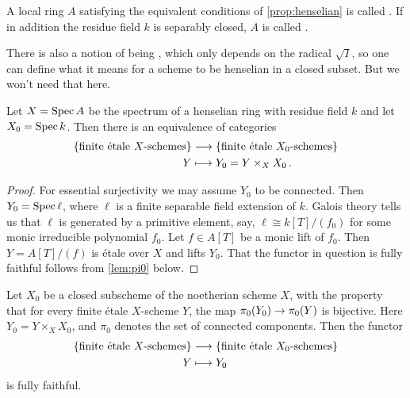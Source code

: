 \documentclass[a4paper, 10pt, oneside, DIV=9, chapterprefix=true, numbers=enddot, bibliography=totoc]{scrbook}
\begin{document}
\begin{defi}\label{def:henselian}
	A local ring $A$ satisfying the equivalent conditions of \cref{prop:henselian} is called . If in addition the residue field $k$ is separably closed, $A$ is called .
\end{defi}
There is also a notion of being , which only depends on the radical $\sqrt{I}$, so one can define what it means for a scheme to be henselian in a closed subset. But we won't need that here.

\begin{prop}\label{prop:pi1Henselian}
	Let $X=\operatorname{Spec} A$ be the spectrum of a henselian ring with residue field $k$ and let $X_0=\operatorname{Spec} k$. Then there is an equivalence of categories
	\begin{align*}
		\left\{\text{finite étale $X$-schemes}\right\}&\morphism \left\{\text{finite étale $X_0$-schemes}\right\}\\
		Y&\longmapsto Y_0=Y\times_XX_0\,.
	\end{align*}
\end{prop}
\begin{proof}
	For essential surjectivity we may assume $Y_0$ to be connected. Then $Y_0=\operatorname{Spec} \ell$, where $\ell$ is a finite separable field extension of $k$. Galois theory tells us that $\ell$ is generated by a primitive element, say, $\ell\cong k[T]/(f_0)$ for some monic irreducible polynomial $f_0$. Let $f\in A[T]$ be a monic lift of $f_0$. Then $Y=A[T]/(f)$ is étale over $X$ and lifts $Y_0$. 
	That the functor in question is fully faithful follows from \cref{lem:pi0} below.
\end{proof}
\begin{lem}\label{lem:pi0}
	Let $X_0$ be a closed subscheme of the noetherian scheme $X$, with the property that for every finite étale $X$-scheme $Y$, the map $\pi_0(Y_0)\morphism \pi_0(Y)$ is bijective. Here $Y_0=Y\times_XX_0$, and $\pi_0$ denotes the set of connected components. Then the functor
	\begin{align*}
		\left\{\text{finite étale $X$-schemes}\right\}&\morphism \left\{\text{finite étale $X_0$-schemes}\right\}\\
		Y&\longmapsto Y_0
	\end{align*}
	is fully faithful.
\end{lem}
\end{document}
